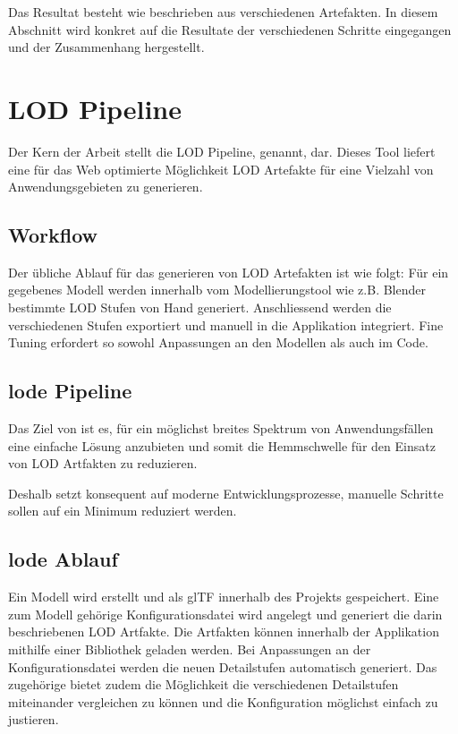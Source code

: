 Das Resultat besteht wie beschrieben aus verschiedenen Artefakten. In diesem Abschnitt wird konkret auf die Resultate der verschiedenen Schritte eingegangen und der Zusammenhang hergestellt.

\section{LOD Pipeline}

Der Kern der Arbeit stellt die LOD Pipeline,  genannt, dar. Dieses Tool liefert eine für das Web optimierte Möglichkeit LOD Artefakte für eine Vielzahl von Anwendungsgebieten zu generieren.

\subsection{Workflow}

Der übliche Ablauf für das generieren von LOD Artefakten ist wie folgt:
Für ein gegebenes Modell werden innerhalb vom Modellierungstool wie z.B. Blender bestimmte LOD Stufen von Hand generiert. Anschliessend werden die verschiedenen Stufen exportiert und manuell in die Applikation integriert. Fine Tuning erfordert so sowohl Anpassungen an den Modellen als auch im Code.

\subsection{lode Pipeline}

Das Ziel von  ist es, für ein möglichst breites Spektrum von Anwendungsfällen eine einfache Lösung anzubieten und somit die Hemmschwelle für den Einsatz von LOD Artfakten zu reduzieren.

Deshalb setzt  konsequent auf moderne Entwicklungsprozesse, manuelle Schritte sollen auf ein Minimum reduziert werden.

\subsection{lode Ablauf}

Ein Modell wird erstellt und als glTF innerhalb des Projekts gespeichert. Eine zum Modell gehörige Konfigurationsdatei wird angelegt und  generiert die darin beschriebenen LOD Artfakte. Die Artfakten können innerhalb der Applikation mithilfe einer Bibliothek geladen werden. Bei Anpassungen an der Konfigurationsdatei werden die neuen Detailstufen automatisch generiert. Das zugehörige  bietet zudem die Möglichkeit die verschiedenen Detailstufen miteinander vergleichen zu können und die Konfiguration möglichst einfach zu justieren.

